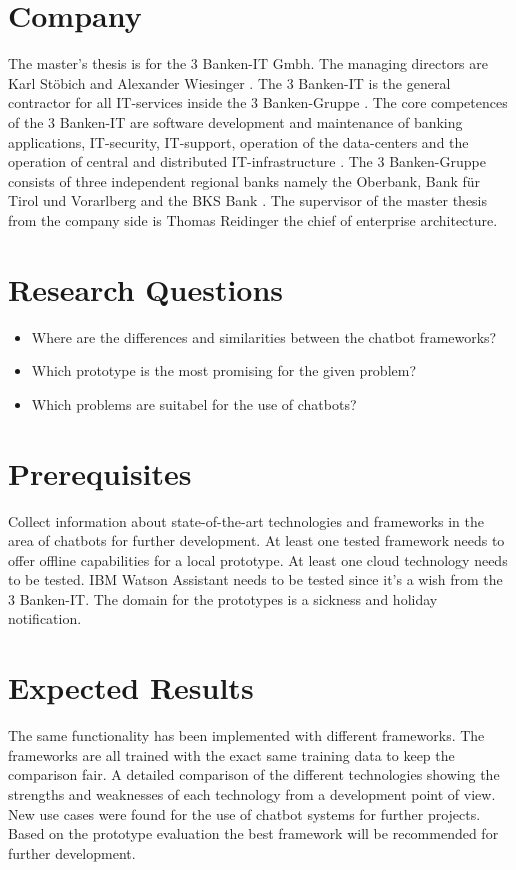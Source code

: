 \section{Company}
The master's thesis is for the 3 Banken-IT Gmbh. The managing directors are Karl St\"obich and Alexander Wiesinger \cite{3bitorgani}. 
The 3 Banken-IT is the general contractor for all IT-services inside the 3 Banken-Gruppe \cite{3bitservices}. 
The core competences of the 3 Banken-IT are software development and maintenance of banking applications, IT-security, 
IT-support, operation of the data-centers and the operation of central and distributed IT-infrastructure \cite{3bitservices}. 
The 3 Banken-Gruppe consists of three independent regional banks namely the Oberbank, Bank für Tirol und Vorarlberg and the BKS Bank \cite{3bitcompany}. 
The supervisor of the master thesis from the company side is Thomas Reidinger the chief of enterprise architecture.

\section{Research Questions}
\begin{itemize}
    \item Where are the differences and similarities between the chatbot frameworks?
    \item Which prototype is the most promising for the given problem?
    \item Which problems are suitabel for the use of chatbots?
\end{itemize}

\section{Prerequisites} \label{sec:prereq}
Collect information about state-of-the-art technologies and frameworks in the area of chatbots for further development.
At least one tested framework needs to offer offline capabilities for a local prototype.
At least one cloud technology needs to be tested.
IBM Watson Assistant needs to be tested since it's a wish from the 3 Banken-IT.
The domain for the prototypes is a sickness and holiday notification.


\section{Expected Results}
The same functionality has been implemented with different frameworks.
The frameworks are all trained with the exact same training data to keep the comparison fair.
A detailed comparison of the different technologies showing the strengths and weaknesses of each technology from a development point of view.
New use cases were found for the use of chatbot systems for further projects.
Based on the prototype evaluation the best framework will be recommended for further development.